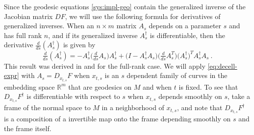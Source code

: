\documentclass[final]{svjour3}
\newcommand{\RR}{\mathbb{R}}
\newcommand{\df}[2]{\tfrac{d}{d#2} #1}
\begin{document}
Since the geodesic equations \eqref{sys:impl-geo} contain the
generalized inverse of the Jacobian matrix $DF$, we will use the following
formula for derivatives of generalized inverses. When an $n\times m$ matrix $A_s$ depends
on a parameter $s$ and has full rank $n$, and if
its generalized inverse $A_s^\dagger$ is differentiable,
then the derivative $\df{(A_s^\dagger)}{s}$ is given by 
\begin{equation}
  \df{(A_s^\dagger)}{s}
  =
  -A_s^\dagger \big(\df{A_s}{s}\big)A_s^\dagger
  +\big(I-A_s^\dagger A_s\big)\big(\df{A_s}{s}^T\big)\big(A_s^\dagger\big)^TA_s^\dagger A_s \ .
  \label{eq:decell-expr}
\end{equation}
This result was derived in \cite{decell_derivative_1974,golub_differentiation_1973}
and \cite{hanson_extensions_1969} for the full-rank case.
We will apply \eqref{eq:decell-expr} with $A_s=D_{x_{t,s}}F$ when $x_{t,s}$ is an $s$ dependent
family of curves in the embedding space $\RR^m$ that are geodesics on $M$ and
when $t$ is fixed. To see 
that $D_{x_{t,s}}F^\dagger$ is
differentiable with respect to $s$ when $x_{t,s}$ depends smoothly on $s$, take a 
frame of the normal space to $M$ in a neighborhood of $x_{t,s}$, and note that 
$D_{x_{t,s}}F^\dagger$ is a composition of a invertible map onto the frame 
depending smoothly on $s$ and the frame itself. 
\end{document}
